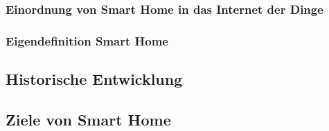     \subsubsection*{Einordnung von Smart Home in das Internet der Dinge}

    \subsubsection{Eigendefinition Smart Home}
    
    \subsection{Historische Entwicklung}

    \subsection{Ziele von Smart Home}